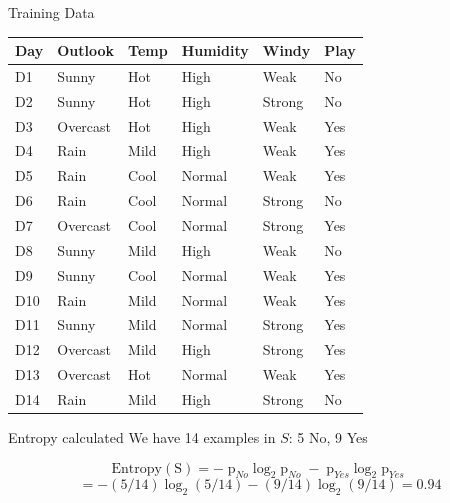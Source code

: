 \documentclass[usenames,dvipsnames]{beamer}
\begin{document}
	\begin{frame}{Training Data}
\begin{tabular}{lllll||l} \toprule
	\textbf{Day} & \textbf{Outlook}  & \textbf{Temp} & \textbf{Humidity} & \textbf{Windy}  & \textbf{Play} \\ \midrule
	D1  & Sunny    & Hot  & High     & Weak   & No   \\
	D2  & Sunny    & Hot  & High     & Strong & No   \\
	D3  & Overcast & Hot  & High     & Weak   & Yes  \\
	D4  & Rain     & Mild & High     & Weak   & Yes  \\
	D5  & Rain     & Cool & Normal   & Weak   & Yes  \\
	D6  & Rain     & Cool & Normal   & Strong & No   \\
	D7  & Overcast & Cool & Normal   & Strong & Yes  \\
	D8  & Sunny    & Mild & High     & Weak   & No   \\
	D9  & Sunny    & Cool & Normal   & Weak   & Yes  \\
	D10 & Rain     & Mild & Normal   & Weak   & Yes  \\
	D11 & Sunny    & Mild & Normal   & Strong & Yes  \\
	D12 & Overcast & Mild & High     & Strong & Yes  \\
	D13 & Overcast & Hot  & Normal   & Weak   & Yes  \\
	D14 & Rain     & Mild & High     & Strong & No  \\ \bottomrule
\end{tabular}
\end{frame}


\begin{frame}{Entropy calculated}
We have 14 examples in $S$: 5 No, 9 Yes

$$\operatorname{Entropy(S)} = -\operatorname{p}_{No}\operatorname{log_2}{\operatorname{p}_{No}}
-\operatorname{p}_{Yes}\operatorname{log_2}{\operatorname{p}_{Yes}}$$
$$
=-(5 / 14) \log _{2}(5 / 14)-(9 / 14) \log _{2}(9 / 14) =0.94
$$
\end{frame}
\end{document}
